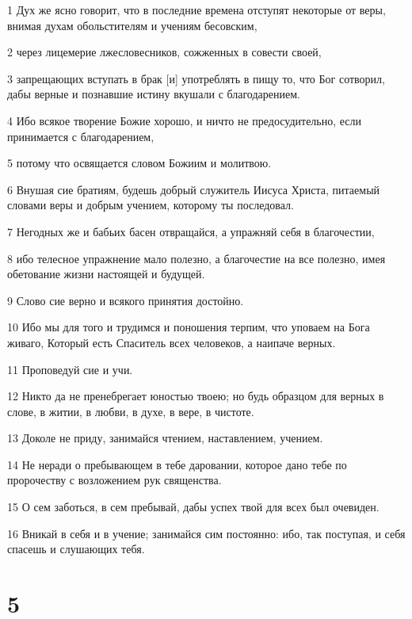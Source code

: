\par 1 Дух же ясно говорит, что в последние времена отступят некоторые от веры, внимая духам обольстителям и учениям бесовским,
\par 2 через лицемерие лжесловесников, сожженных в совести своей,
\par 3 запрещающих вступать в брак [и] употреблять в пищу то, что Бог сотворил, дабы верные и познавшие истину вкушали с благодарением.
\par 4 Ибо всякое творение Божие хорошо, и ничто не предосудительно, если принимается с благодарением,
\par 5 потому что освящается словом Божиим и молитвою.
\par 6 Внушая сие братиям, будешь добрый служитель Иисуса Христа, питаемый словами веры и добрым учением, которому ты последовал.
\par 7 Негодных же и бабьих басен отвращайся, а упражняй себя в благочестии,
\par 8 ибо телесное упражнение мало полезно, а благочестие на все полезно, имея обетование жизни настоящей и будущей.
\par 9 Слово сие верно и всякого принятия достойно.
\par 10 Ибо мы для того и трудимся и поношения терпим, что уповаем на Бога живаго, Который есть Спаситель всех человеков, а наипаче верных.
\par 11 Проповедуй сие и учи.
\par 12 Никто да не пренебрегает юностью твоею; но будь образцом для верных в слове, в житии, в любви, в духе, в вере, в чистоте.
\par 13 Доколе не приду, занимайся чтением, наставлением, учением.
\par 14 Не неради о пребывающем в тебе даровании, которое дано тебе по пророчеству с возложением рук священства.
\par 15 О сем заботься, в сем пребывай, дабы успех твой для всех был очевиден.
\par 16 Вникай в себя и в учение; занимайся сим постоянно: ибо, так поступая, и себя спасешь и слушающих тебя.

\chapter{5}


